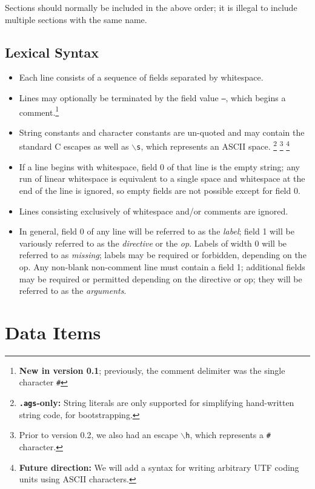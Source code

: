 \documentclass{report}
\newcommand\bs{$\backslash$}
\newcommand\stringcode[1]{\texttt{#1}}
\newcommand\agsonly[1]{\footnote{\textbf{\texttt{.ags}-only: }#1}}
\newcommand\old[2]{\footnote{Prior to version #1, #2}}
\newcommand\new[2]{\footnote{\textbf{New in version #1}; previously, #2}}
\newcommand\future[1]{\footnote{\textbf{Future direction:} #1}}
\begin{document}
Sections should normally be included in the above order;
it is illegal to include multiple sections with the same name.

\section{Lexical Syntax}

\begin{itemize}
    \item Each line consists of a sequence of fields separated by whitespace.

    \item Lines may optionally be terminated by the field value \stringcode{--}, which begins a comment.\new{0.1}{the comment delimiter was the single character \stringcode{\#}}

    \item String constants and character constants are un-quoted and may contain the standard C escapes as well as
        \stringcode{\bs{}s}, which represents an ASCII space.
        \agsonly{String literals are only supported for simplifying hand-written string code, for bootstrapping.}
        \old{0.2}{we also had an escape \stringcode{\bs{}h}, which represents a \stringcode{\#} character.}
        \future{We will add a syntax for writing arbitrary UTF coding units using ASCII characters.}

    \item If a line begins with whitespace, field 0 of that line is the empty string;
        any run of linear whitespace is equivalent to a single space and whitespace at the end of the line is ignored,
        so empty fields are not possible except for field 0.

    \item Lines consisting exclusively of whitespace and/or comments are ignored.

    \item In general, field 0 of any line will be referred to as the \emph{label};
        field 1 will be variously referred to as the \emph{directive} or the \emph{op}.
        Labels of width 0 will be referred to as \emph{missing};
        labels may be required or forbidden, depending on the op.
        Any non-blank non-comment line must contain a field 1;
        additional fields may be required or permitted depending on the directive or op;
        they will be referred to as the \emph{arguments}.
\end{itemize}

\chapter{Data Items}
\end{document}

